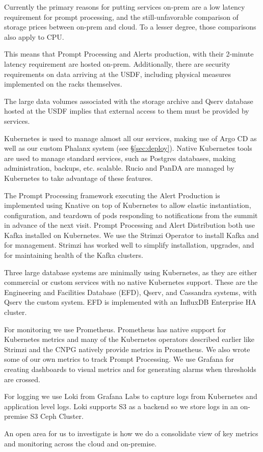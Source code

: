 Currently the primary reasons for putting services on-prem are a low
latency requirement for prompt processing, and the still-unfavorable
comparison of storage prices between on-prem and cloud. To a lesser
degree, those comparisons also apply to CPU.

This means that Prompt Processing and Alerts production, with their
2-minute latency requirement are hosted on-prem. Additionally, there
are security requirements on data arriving at the USDF, including
physical measures implemented on the racks themselves.

The large data volumes associated with the storage archive and Qserv
database hosted at the USDF implies that external access to them must be
provided by services.

Kubernetes is used to manage almost all our services, making use of
Argo CD as well as our custom Phalanx system (see \S \ref{sec:deploy}).
Native Kubernetes tools
are used to manage standard services, such as Postgres databases,
making administration, backups, etc. scalable. Rucio and PanDA are
managed by Kubernetes to take advantage of these features.

The Prompt Processing framework executing the Alert Production is implemented
using Knative on top of
Kubernetes to allow elastic instantiation, configuration, and teardown of
pods responding to notifications from the summit in advance of the
next visit.
Prompt Processing and Alert Distribution both use Kafka installed on Kubernetes.
We use the Strimzi Operator to install Kafka and for management.  Strimzi
has worked well to simplify installation, upgrades, and for maintaining
health of the Kafka clusters.

Three large database systems are minimally using Kubernetes, as they
are either commercial or custom services with no native Kubernetes
support. These are the Engineering and Facilities Database (EFD),
Qserv, and Cassandra systems, with Qserv the custom system. EFD is
implemented with an InfluxDB Enterprise HA cluster.

For monitoring we use Prometheus.  Prometheus has native support for
Kubernetes metrics and many of the Kubernetes operators described earlier
like Strimzi and the CNPG natively provide metrics in Prometheus. We also
wrote some of our own metrics to track Prompt Processing.
We use Grafana for creating dashboards to visual metrics and for generating alarms when thresholds are crossed.

For logging we use Loki from Grafana Labs to capture logs from Kubernetes
and application level logs.  Loki supports S3 as a backend so we store logs
in an on-premise S3 Ceph Cluster.

An open area for us to investigate is how we do a consolidate view of key
metrics and monitoring across the cloud and on-premise.
